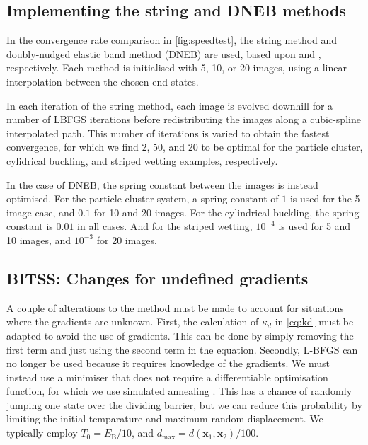 \documentclass[twocolumn,10pt]{revtex4}
\newcommand{\bm}[1]{\boldsymbol{\mathbf{#1}}}
\begin{document}
\subsection{Implementing the string and DNEB methods}
In the convergence rate comparison in \cref{fig:speedtest}, the string method and doubly-nudged elastic band method (DNEB) are used, based upon \cite{E2007} and \cite{Trygubenko2004}, respectively.
Each method is initialised with 5, 10, or 20 images, using a linear interpolation between the chosen end states.

In each iteration of the string method, each image is evolved downhill for a number of LBFGS iterations before redistributing the images along a cubic-spline interpolated path.
This number of iterations is varied to obtain the fastest convergence, for which we find 2, 50, and 20 to be optimal for the particle cluster, cylidrical buckling, and striped wetting examples, respectively.

In the case of DNEB, the spring constant between the images is instead optimised.
For the particle cluster system, a spring constant of $1$ is used for the 5 image case, and $0.1$ for 10 and 20 images.
For the cylindrical buckling, the spring constant is $0.01$ in all cases.
And for the striped wetting, $10^{-4}$ is used for 5 and 10 images, and $10^{-3}$ for 20 images.

\subsection{BITSS: Changes for undefined gradients}
A couple of alterations to the method must be made to account for situations where the gradients are unknown.
First, the calculation of $\kappa_d$ in \cref{eq:kd} must be adapted to avoid the use of gradients.
This can be done by simply removing the first term and just using the second term in the equation.
Secondly, L-BFGS can no longer be used because it requires knowledge of the gradients.
We must instead use a minimiser that does not require a differentiable optimisation function, for which we use simulated annealing \cite{Kirkpatrick1983}.
This has a chance of randomly jumping one state over the dividing barrier, but we can reduce this probability by limiting the initial temparature and maximum random displacement.
We typically employ $T_0 = E_\mathrm{B} / 10$, and $d_\mathrm{max} = d(\bm{x}_1, \bm{x}_2) / 100$.
\end{document}
